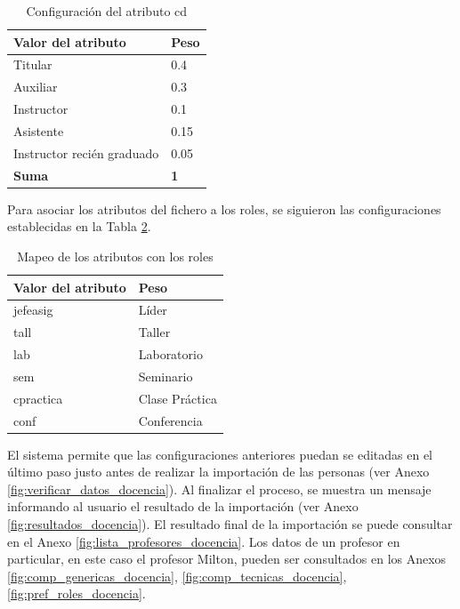 \begin{table}[H]
	\centering
	\caption{Configuración del atributo cd}\label{table:config_competencias_docencia}
	\begin{tabular} {l | l}
		\toprule
		\textbf{Valor del atributo} & \textbf{Peso} \\ \midrule
		Titular & 0.4 \\ \hline
		Auxiliar & 0.3 \\ \hline
		Instructor & 0.1 \\ \hline
		Asistente & 0.15 \\ \hline
		Instructor recién graduado & 0.05  \\ \hline		
		\textbf{Suma} & \textbf{1} \\ \bottomrule
	\end{tabular}
\end{table}

Para asociar los atributos del fichero a los roles, se siguieron las configuraciones establecidas en la Tabla \ref{table:mapeo_roles_docencia}.

\begin{table}[H]
	\centering
	\caption{Mapeo de los atributos con los roles}\label{table:mapeo_roles_docencia}
	\begin{tabular} {l | l}
		\toprule
		\textbf{Valor del atributo} & \textbf{Peso} \\ \midrule
		jefeasig & Líder \\ \hline
		tall & Taller \\ \hline
		lab & Laboratorio \\ \hline
		sem & Seminario \\ \hline
		cpractica & Clase Práctica  \\ \hline		
		conf & Conferencia \\ \bottomrule
	\end{tabular}
\end{table}

El sistema permite que las configuraciones anteriores puedan se editadas en el último paso justo antes de realizar la importación de las personas (ver Anexo \ref{fig:verificar_datos_docencia}). Al finalizar el proceso, se muestra un mensaje informando al usuario el resultado de la importación (ver Anexo \ref{fig:resultados_docencia}). El resultado final de la importación se puede consultar en el Anexo \ref{fig:lista_profesores_docencia}. Los datos de un profesor en particular, en este caso el profesor Milton, pueden ser consultados en los Anexos \ref{fig:comp_genericas_docencia}, \ref{fig:comp_tecnicas_docencia}, \ref{fig:pref_roles_docencia}.

